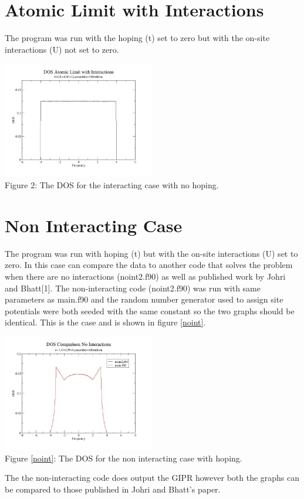 \documentclass{article}
\begin{document}
\section{Atomic Limit with Interactions}
The program was run with the hoping (t) set to zero but with the on-site interactions (U) not set to zero.

\begin{center}
	\includegraphics[width=250px]{dos2_t0u4w12.jpg} \\
	Figure 2: The DOS for the interacting case with no hoping.
\end{center}

\section{Non Interacting Case}
The program was run with hoping (t) but with the on-site interactions (U) set to zero. In this case can compare the data to another code that solves the problem when there are no interactions (noint2.f90) as well as published work by Johri and Bhatt[1]. The non-interacting code (noint2.f90) was run with same parameters as main.f90 and the random number generator used to assign site potentials were both seeded with the same constant so the two graphs should be identical. This is the case and is shown in figure \ref{noint}.
\begin{center} 
	\includegraphics[width=250px]{dos_compareu0.jpg} \\ \label{noint}
	Figure \ref{noint}: The DOS for the non interacting case with hoping.
\end{center}
The the non-interacting code does output the GIPR however both the graphs can be compared to those published in Johri and Bhatt's paper.
\end{document}
